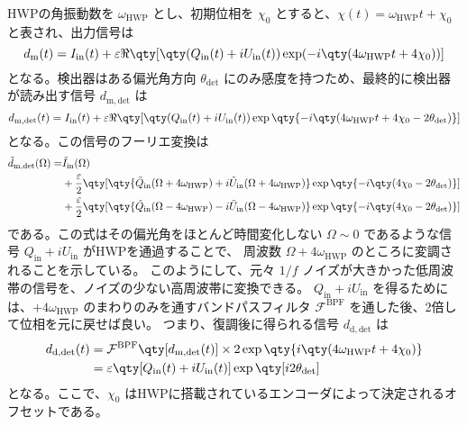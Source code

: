 HWPの角振動数を $\omega_{\mathrm{HWP}}$ とし、初期位相を $\chi_0$ とすると、$\chi(t) = \omega_{\mathrm{HWP}}t + \chi_{0}$ と表され、出力信号は
\begin{equation}
    d_{\mathrm{m}}(t) = I_{\mathrm{in}}(t) + \varepsilon\Re\qty[\qty(Q_{\mathrm{in}}(t)+iU_{\mathrm{in}}(t))\exp(-i \qty(4\omega_{\mathrm{HWP}}t + 4\chi_0))]
\end{equation}
となる。検出器はある偏光角方向 $\theta_{\mathrm{det}}$ にのみ感度を持つため、最終的に検出器が読み出す信号 $d_{\mathrm{m}, \mathrm{det}}$ は
\begin{equation}
    \label{eq:so-hwp_modulation}
    d_{\mathrm{m}, \mathrm{det}}(t) = I_{\mathrm{in}}(t) + \varepsilon\Re\qty[\qty(Q_{\mathrm{in}}(t)+iU_{\mathrm{in}}(t))\exp\qty{-i \qty(4\omega_{\mathrm{HWP}}t + 4\chi_0 - 2\theta_{\mathrm{det}})}]
\end{equation}
となる。この信号のフーリエ変換は
\begin{equation}
    \begin{split}
        \tilde{d}_{\mathrm{m}, \mathrm{det}}(\Omega) = &\tilde{I}_{\mathrm{in}}(\Omega) \\
            &+ \dfrac{\varepsilon}{2}\qty[\qty{\tilde{Q}_{\mathrm{in}}(\Omega+4\omega_{\mathrm{HWP}})+i\tilde{U}_{\mathrm{in}}(\Omega+4\omega_{\mathrm{HWP}})}\exp\qty{-i\qty(4\chi_0 - 2\theta_{\mathrm{det}})}] \\
            &+ \dfrac{\varepsilon}{2}\qty[\qty{\tilde{Q}_{\mathrm{in}}(\Omega-4\omega_{\mathrm{HWP}})-i\tilde{U}_{\mathrm{in}}(\Omega-4\omega_{\mathrm{HWP}})}\exp\qty{-i\qty(4\chi_0 - 2\theta_{\mathrm{det}})}]
    \end{split}
\end{equation}
である。この式はその偏光角をほとんど時間変化しない $\Omega\sim0$ であるような信号 $Q_{\mathrm{in}}+iU_{\mathrm{in}}$ がHWPを通過することで、
周波数 $\Omega + 4\omega_{\mathrm{HWP}}$ のところに変調されることを示している。
このようにして、元々 $1/f$ ノイズが大きかった低周波帯の信号を、ノイズの少ない高周波帯に変換できる。
$Q_{\mathrm{in}}+iU_{\mathrm{in}}$ を得るためには、$+4\omega_{\mathrm{HWP}}$ のまわりのみを通すバンドパスフィルタ $\mathcal{F}^{\mathrm{BPF}}$ を通した後、2倍して位相を元に戻せば良い。
つまり、復調後に得られる信号 $d_{\mathrm{d, det}}$ は
\begin{align}
    d_{\mathrm{d, det}}(t) &= \mathcal{F}^{\mathrm{BPF}}\qty[d_{\mathrm{m,det}}(t)]\times 2\exp\qty{i\qty(4\omega_{\mathrm{HWP}}t + 4\chi_0)} \\
    &= \varepsilon\qty[Q_{\mathrm{in}}(t) + iU_{\mathrm{in}}(t)]\exp\qty[i2\theta_{\mathrm{det}}]
    \label{eq:so-hwp_demod}
\end{align}
となる。ここで、$\chi_0$ はHWPに搭載されているエンコーダによって決定されるオフセットである。